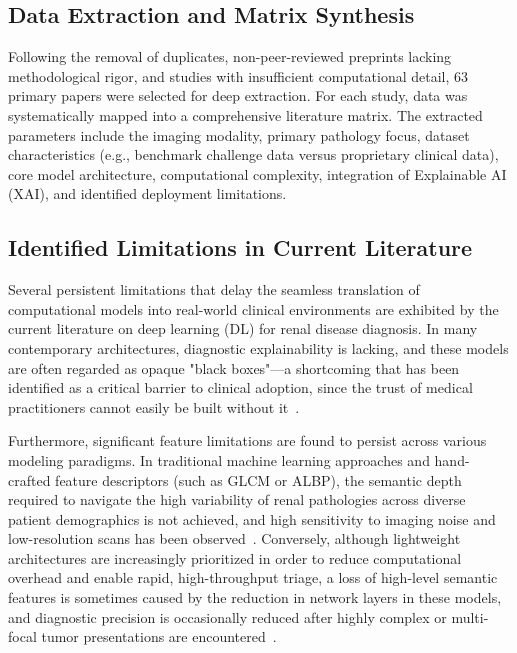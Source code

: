 \subsection{Data Extraction and Matrix Synthesis}
Following the removal of duplicates, non-peer-reviewed preprints lacking methodological rigor, and studies with insufficient computational detail, 63 primary papers were selected for deep extraction. For each study, data was systematically mapped into a comprehensive literature matrix. The extracted parameters include the imaging modality, primary pathology focus, dataset characteristics (e.g., benchmark challenge data versus proprietary clinical data), core model architecture, computational complexity, integration of Explainable AI (XAI), and identified deployment limitations.

\subsection{Identified Limitations in Current Literature}
Several persistent limitations that delay the seamless translation of computational models into real-world clinical environments are exhibited by the current literature on deep learning (DL) for renal disease diagnosis. In many contemporary architectures, diagnostic explainability is lacking, and these models are often regarded as opaque "black boxes"---a shortcoming that has been identified as a critical barrier to clinical adoption, since the trust of medical practitioners cannot easily be built without it~\cite{kadhim2024machine}.

Furthermore, significant feature limitations are found to persist across various modeling paradigms. In traditional machine learning approaches and hand-crafted feature descriptors (such as GLCM or ALBP), the semantic depth required to navigate the high variability of renal pathologies across diverse patient demographics is not achieved, and high sensitivity to imaging noise and low-resolution scans has been observed~\cite{farjad2021ct, hossain2024adaptive}. Conversely, although lightweight architectures are increasingly prioritized in order to reduce computational overhead and enable rapid, high-throughput triage, a loss of high-level semantic features is sometimes caused by the reduction in network layers in these models, and diagnostic precision is occasionally reduced after highly complex or multi-focal tumor presentations are encountered~\cite{bhandari2023lightweight, alqahtani2025kidneynext}.

